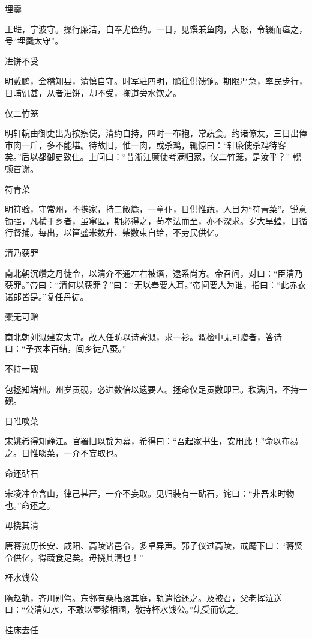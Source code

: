 \documentclass[a4paper,12pt,UTF8,twoside]{ctexbook}
\begin{document}
    埋羹
    
    王琎，宁波守。操行廉洁，自奉尤俭约。一日，见馔兼鱼肉，大怒，令辍而瘗之，号“埋羹太守”。
    
    进饼不受
    
    明戴鹏，会稽知县，清慎自守。时军驻四明，鹏往供馈饷。期限严急，率民步行，日晡饥甚，从者进饼，却不受，掬道旁水饮之。
    
    仅二竹笼
    
    明轩輗由御史出为按察使，清约自持，四时一布袍，常蔬食。约诸僚友，三日出俸市肉一斤，多不能堪。待故旧，惟一肉，或杀鸡，辄惊曰：“轩廉使杀鸡待客矣。”后以都御史致仕。上问曰：“昔浙江廉使考满归家，仅二竹笼，是汝乎？” 輗顿首谢。
    
    符青菜
    
    明符验，守常州，不携家，持二敝簏，一童仆，日供惟蔬，人目为“符青菜”。锐意锄强，凡横于乡者，虽窜匿，期必得之，苟奉法而至，亦不深求。岁大旱蝗，日循行督捕。每出，以筐盛米数升、柴数束自给，不劳民供亿。
    
    清乃获罪
    
    南北朝沉巑之丹徒令，以清介不通左右被谮，逮系尚方。帝召问，对曰：“臣清乃获罪。”帝曰：“清何以获罪？”曰：“无以奉要人耳。”帝问要人为谁，指曰：“此赤衣诸郎皆是。”复任丹徒。
    
    橐无可赠
    
    南北朝刘溉建安太守。故人任昉以诗寄溉，求一衫。溉检中无可赠者，答诗曰：“予衣本百结，闽乡徒八蚕。”
    
    不持一砚
    
    包拯知端州。州岁贡砚，必进数倍以遗要人。拯命仅足贡数即已。秩满归，不持一砚。
    
    日唯啖菜
    
    宋姚希得知静江。官署旧以锦为幕，希得曰：“吾起家书生，安用此！”命以布易之。日惟啖菜，一介不妄取也。
    
    命还砧石
    
    宋凌冲令含山，律己甚严，一介不妄取。见归装有一砧石，诧曰：“非吾来时物也。”命还之。
    
    毋挠其清
    
    唐蒋沇历长安、咸阳、高陵诸邑令，多卓异声。郭子仪过高陵，戒麾下曰：“蒋贤令供亿，得蔬食足矣。毋挠其清也！”
    
    杯水饯公
    
    隋赵轨，齐川别驾。东邻有桑椹落其庭，轨遣拾还之。及被召，父老挥泣送曰：“公清如水，不敢以壶浆相溷，敬持杯水饯公。”轨受而饮之。
    
    挂床去任
    
\end{document}

